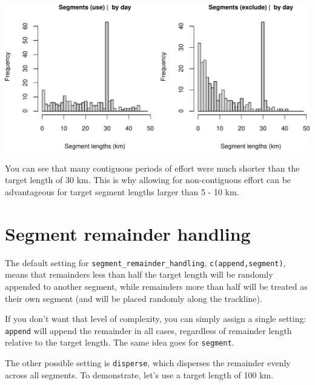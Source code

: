 \documentclass[
]{book}
\begin{document}
\includegraphics{figures/unnamed-chunk-80-1.pdf}

You can see that many contiguous periods of effort were much shorter than the target length of 30 km. This is why allowing for non-contiguous effort can be advantageous for target segment lengths larger than 5 - 10 km.

\hypertarget{segment-remainder-handling}{%
\section*{Segment remainder handling}\label{segment-remainder-handling}}

The default setting for \texttt{segment\_remainder\_handling}, \texttt{c(\textquotesingle{}append\textquotesingle{},\textquotesingle{}segment\textquotesingle{})}, means that remainders less than half the target length will be randomly appended to another segment, while remainders more than half will be treated as their own segment (and will be placed randomly along the trackline).

If you don't want that level of complexity, you can simply assign a single setting: \texttt{\textquotesingle{}append\textquotesingle{}} will append the remainder in all cases, regardless of remainder length relative to the target length. The same idea goes for \texttt{\textquotesingle{}segment\textquotesingle{}}.

The other possible setting is \texttt{\textquotesingle{}disperse\textquotesingle{}}, which disperses the remainder evenly across all segments. To demonstrate, let's use a target length of 100 km.
\end{document}

